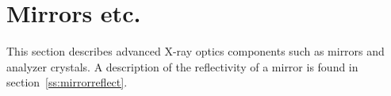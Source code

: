 \section{Mirrors etc.}
\label{s:mirrors}

This section describes advanced X-ray optics
components such as mirrors and analyzer crystals.
A description of the reflectivity of a mirror is found
in section~\ref{ss:mirrorreflect}.
 
